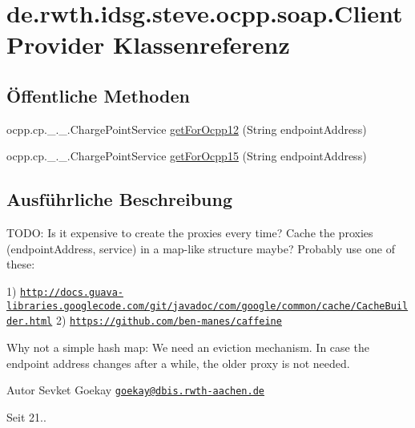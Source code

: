 \hypertarget{classde_1_1rwth_1_1idsg_1_1steve_1_1ocpp_1_1soap_1_1_client_provider}{\section{de.\+rwth.\+idsg.\+steve.\+ocpp.\+soap.\+Client\+Provider Klassenreferenz}
\label{classde_1_1rwth_1_1idsg_1_1steve_1_1ocpp_1_1soap_1_1_client_provider}
}
\subsection*{Öffentliche Methoden}
\begin{DoxyCompactItemize}
\item 
ocpp.\+cp.\+\_.\+\_.\+Charge\+Point\+Service \hyperlink{classde_1_1rwth_1_1idsg_1_1steve_1_1ocpp_1_1soap_1_1_client_provider_a95903bb042da0bb406df12662ee63f0d}{get\+For\+Ocpp12} (String endpoint\+Address)
\item 
ocpp.\+cp.\+\_.\+\_.\+Charge\+Point\+Service \hyperlink{classde_1_1rwth_1_1idsg_1_1steve_1_1ocpp_1_1soap_1_1_client_provider_a52b89de5492c783ede0a062c2f1bdac0}{get\+For\+Ocpp15} (String endpoint\+Address)
\end{DoxyCompactItemize}


\subsection{Ausführliche Beschreibung}
T\+O\+D\+O\+: Is it expensive to create the proxies every time? Cache the proxies (endpoint\+Address, service) in a map-\/like structure maybe? Probably use one of these\+:

1) \href{http://docs.guava-libraries.googlecode.com/git/javadoc/com/google/common/cache/CacheBuilder.html}{\tt http\+://docs.\+guava-\/libraries.\+googlecode.\+com/git/javadoc/com/google/common/cache/\+Cache\+Builder.\+html} 2) \href{https://github.com/ben-manes/caffeine}{\tt https\+://github.\+com/ben-\/manes/caffeine}

Why not a simple hash map\+: We need an eviction mechanism. In case the endpoint address changes after a while, the older proxy is not needed.

\begin{DoxyAuthor}{Autor}
Sevket Goekay \href{mailto:goekay@dbis.rwth-aachen.de}{\tt goekay@dbis.\+rwth-\/aachen.\+de} 
\end{DoxyAuthor}
\begin{DoxySince}{Seit}
21.. 
\end{DoxySince}


